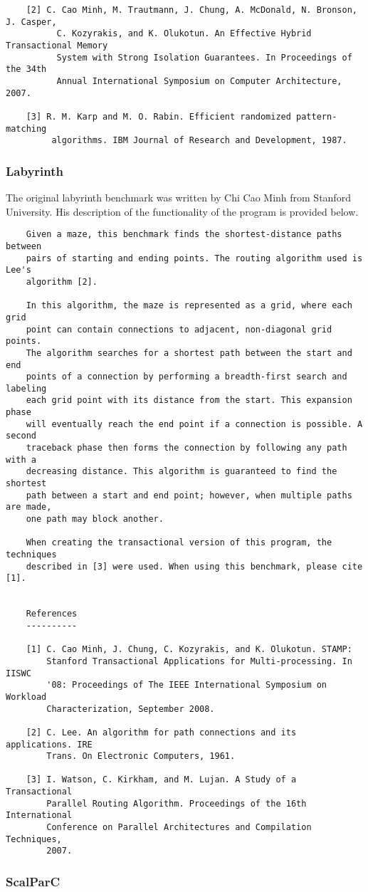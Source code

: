\documentclass{article}
\begin{document}
\begin{verbatim}
    [2] C. Cao Minh, M. Trautmann, J. Chung, A. McDonald, N. Bronson, J. Casper,
          C. Kozyrakis, and K. Olukotun. An Effective Hybrid Transactional Memory
          System with Strong Isolation Guarantees. In Proceedings of the 34th 
          Annual International Symposium on Computer Architecture, 2007.

    [3] R. M. Karp and M. O. Rabin. Efficient randomized pattern-matching
         algorithms. IBM Journal of Research and Development, 1987.

\end{verbatim}

\subsubsection{Labyrinth}

The original labyrinth benchmark was written by Chi Cao Minh from Stanford 
University. His description of the functionality of the program is provided 
below.

\begin{verbatim}
    Given a maze, this benchmark finds the shortest-distance paths between
    pairs of starting and ending points. The routing algorithm used is Lee's 
    algorithm [2].
 
    In this algorithm, the maze is represented as a grid, where each grid 
    point can contain connections to adjacent, non-diagonal grid points. 
    The algorithm searches for a shortest path between the start and end 
    points of a connection by performing a breadth-first search and labeling 
    each grid point with its distance from the start. This expansion phase 
    will eventually reach the end point if a connection is possible. A second 
    traceback phase then forms the connection by following any path with a 
    decreasing distance. This algorithm is guaranteed to find the shortest 
    path between a start and end point; however, when multiple paths are made, 
    one path may block another.

    When creating the transactional version of this program, the techniques
    described in [3] were used. When using this benchmark, please cite [1].


    References
    ----------

    [1] C. Cao Minh, J. Chung, C. Kozyrakis, and K. Olukotun. STAMP: 
        Stanford Transactional Applications for Multi-processing. In IISWC
        '08: Proceedings of The IEEE International Symposium on Workload 
        Characterization, September 2008. 

    [2] C. Lee. An algorithm for path connections and its applications. IRE 
        Trans. On Electronic Computers, 1961.

    [3] I. Watson, C. Kirkham, and M. Lujan. A Study of a Transactional 
        Parallel Routing Algorithm. Proceedings of the 16th International 
        Conference on Parallel Architectures and Compilation Techniques, 
        2007.
\end{verbatim}

\subsubsection{ScalParC}


\end{document}
